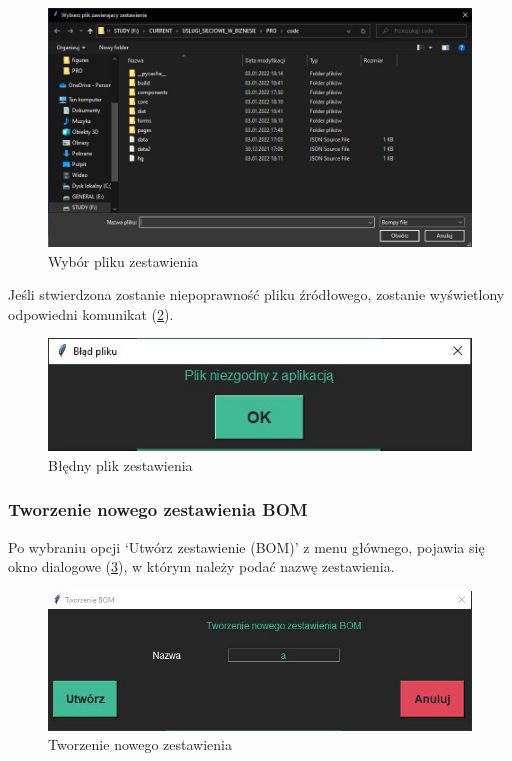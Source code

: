 \documentclass[12pt,twoside]{article}
\begin{document}
\begin{figure}[h]
	\centering
	\includegraphics[width=\textwidth]{figures/app/read_file.jpg}
	\caption{Wybór pliku zestawienia}
\label{fig:app:read_file}
\end{figure}

Jeśli stwierdzona zostanie niepoprawność pliku źródłowego, zostanie wyświetlony odpowiedni komunikat (\ref{fig:app:read_file_err}).

\begin{figure}[h]
	\centering
	\includegraphics[width=\textwidth]{figures/app/read_file_err.jpg}
	\caption{Błędny plik zestawienia}
\label{fig:app:read_file_err}
\end{figure}


\subsubsection*{Tworzenie nowego zestawienia BOM}
Po wybraniu opcji \enquote*{Utwórz zestawienie (BOM)} z menu głównego, pojawia się okno dialogowe (\ref{fig:app:create_bom_dialog}), w którym należy podać nazwę zestawienia. 

\begin{figure}[h]
	\centering
	\includegraphics[width=\textwidth]{figures/app/create_bom_dialog.jpg}
	\caption{Tworzenie nowego zestawienia}
\label{fig:app:create_bom_dialog}
\end{figure}
\end{document}

